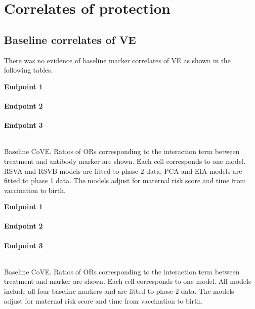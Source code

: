 \documentclass[11pt]{article}
\begin{document}
\clearpage

\clearpage

\hypertarget{correlates-of-protection}{%
\section{Correlates of protection}\label{correlates-of-protection}}

\hypertarget{baseline-correlates-of-ve}{%
\subsection{Baseline correlates of VE}\label{baseline-correlates-of-ve}}

There was no evidence of baseline marker correlates of VE as shown in the following tables.

\begin{table}[H]
\scriptsize{
    \textbf{Endpoint 1}\\
    \\
    
    \textbf{Endpoint 2}\\
    \\
    
    \textbf{Endpoint 3}\\
    \\
    
}
    \caption{Baseline CoVE. Ratios of ORs corresponding to the interaction term between treatment and antibody marker are shown. Each cell corresponds to one model. RSVA and RSVB models are fitted to phase 2 data, PCA and EIA models are fitted to phase 1 data.
   The models adjust for maternal risk score and time from vaccination to birth.
     }
    \label{tab:CoVE_baseline}
\end{table}

\begin{table}[H]
\scriptsize{
    \textbf{Endpoint 1}\\
    \\
    
    \textbf{Endpoint 2}\\
    \\
    
    \textbf{Endpoint 3}\\
    \\
    
}
    \caption{Baseline CoVE. Ratios of ORs corresponding to the interaction term between treatment and marker are shown. Each cell corresponds to one model. All models include all four baseline markers and are fitted to phase 2 data.
    The models adjust for maternal risk score and time from vaccination to birth.
     }
    \label{tab:CoVE_baseline_4}
\end{table}
\end{document}
